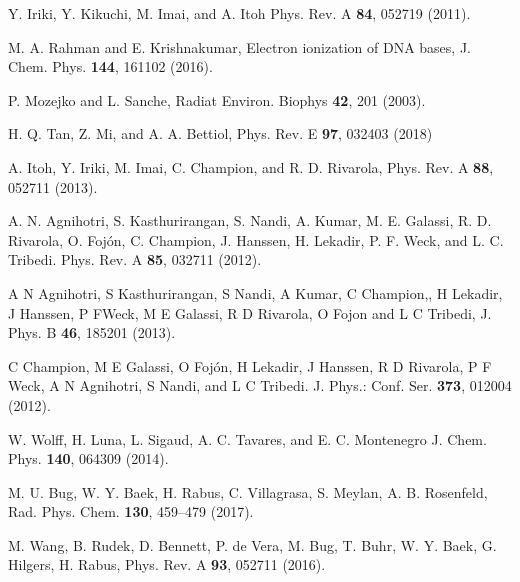 \documentclass[10pt,showpacs,twocolumn]{revtex4}
\begin{document}

\bigskip

\begin{thebibliography}{}

Y. Iriki, Y. Kikuchi, M. Imai, and A. Itoh
Phys. Rev. A \textbf{84}, 052719 (2011).

M. A. Rahman and E. Krishnakumar,
Electron ionization of DNA bases,
J. Chem. Phys. \textbf{144}, 161102 (2016).

P. Mozejko and L. Sanche, 
Radiat Environ. Biophys \textbf{42}, 201 (2003).

H. Q. Tan, Z. Mi, and A. A. Bettiol, 
Phys. Rev. E \textbf{97}, 032403 (2018)

A. Itoh, Y. Iriki, M. Imai, C. Champion, and R. D. Rivarola, 
Phys. Rev. A \textbf{88}, 052711 (2013).

A. N. Agnihotri, S. Kasthurirangan, S. Nandi, A.
Kumar, M. E. Galassi, R. D. Rivarola, O. Foj\'{o}n, C. Champion, J. Hanssen,
H. Lekadir, P. F. Weck, and L. C. Tribedi. 
Phys. Rev. A \textbf{85}, 032711 (2012).

A N Agnihotri, S Kasthurirangan, S Nandi, A Kumar, C Champion,, H Lekadir, 
J Hanssen, P FWeck, M E Galassi, R D Rivarola, O Fojon and L C Tribedi, 
J. Phys. B \textbf{46}, 185201 (2013).

C Champion, M E Galassi, O Foj\'{o}n, H Lekadir, J Hanssen, R D Rivarola,
P F Weck, A N Agnihotri, S Nandi, and L C Tribedi. 
J. Phys.: Conf. Ser. \textbf{373}, 012004 (2012).

W. Wolff, H. Luna, L. Sigaud, A. C. Tavares, and E. C. Montenegro
J. Chem. Phys. \textbf{140}, 064309 (2014).

M. U. Bug, W. Y. Baek, H. Rabus, C. Villagrasa, S. Meylan, A. B. Rosenfeld,
Rad. Phys. Chem. \textbf{130}, 459--479 (2017).

M. Wang, B. Rudek, D. Bennett, P. de Vera, M. Bug, T. Buhr, W. Y. Baek, 
G. Hilgers, H. Rabus, 
Phys. Rev. A \textbf{93}, 052711 (2016).


\end{thebibliography}
\end{document}
